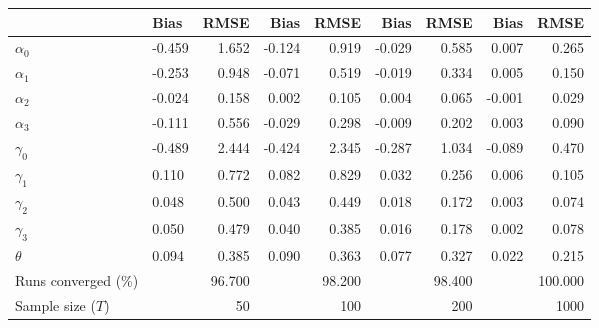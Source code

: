 
\begin{tabular}[t]{llrrrrrrr}
\toprule
  & Bias & RMSE & Bias & RMSE & Bias & RMSE & Bias & RMSE\\
\midrule
$\alpha_{0}$ & -0.459 & 1.652 & -0.124 & 0.919 & -0.029 & 0.585 & 0.007 & 0.265\\
$\alpha_{1}$ & -0.253 & 0.948 & -0.071 & 0.519 & -0.019 & 0.334 & 0.005 & 0.150\\
$\alpha_{2}$ & -0.024 & 0.158 & 0.002 & 0.105 & 0.004 & 0.065 & -0.001 & 0.029\\
$\alpha_{3}$ & -0.111 & 0.556 & -0.029 & 0.298 & -0.009 & 0.202 & 0.003 & 0.090\\
$\gamma_{0}$ & -0.489 & 2.444 & -0.424 & 2.345 & -0.287 & 1.034 & -0.089 & 0.470\\
$\gamma_{1}$ & 0.110 & 0.772 & 0.082 & 0.829 & 0.032 & 0.256 & 0.006 & 0.105\\
$\gamma_{2}$ & 0.048 & 0.500 & 0.043 & 0.449 & 0.018 & 0.172 & 0.003 & 0.074\\
$\gamma_{3}$ & 0.050 & 0.479 & 0.040 & 0.385 & 0.016 & 0.178 & 0.002 & 0.078\\
$\theta$ & 0.094 & 0.385 & 0.090 & 0.363 & 0.077 & 0.327 & 0.022 & 0.215\\
Runs converged (\%) &  & 96.700 &  & 98.200 &  & 98.400 &  & 100.000\\
Sample size ($T$) &  & 50 &  & 100 &  & 200 &  & 1000\\
\bottomrule
\end{tabular}
